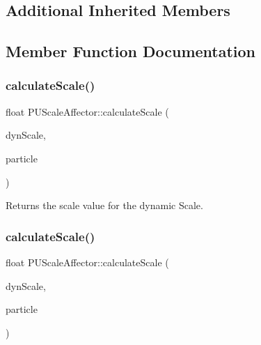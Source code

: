 \subsection*{Additional Inherited Members}


\subsection{Member Function Documentation}
\mbox{\label{classPUScaleAffector_a4a99c8bf0597163dbc7f25f8cdf69699}} 
\subsubsection{\texorpdfstring{calculate\+Scale()}{calculateScale()}\hspace{0.1cm}{\footnotesize\ttfamily [1/2]}}
{\footnotesize\ttfamily float P\+U\+Scale\+Affector\+::calculate\+Scale (\begin{DoxyParamCaption}\item[{\hyperlink{classPUDynamicAttribute}{P\+U\+Dynamic\+Attribute} $\ast$}]{dyn\+Scale,  }\item[{\hyperlink{structPUParticle3D}{P\+U\+Particle3D} $\ast$}]{particle }\end{DoxyParamCaption})\hspace{0.3cm}{\ttfamily [protected]}}

Returns the scale value for the dynamic Scale. \mbox{\label{classPUScaleAffector_a4a99c8bf0597163dbc7f25f8cdf69699}} 
\subsubsection{\texorpdfstring{calculate\+Scale()}{calculateScale()}\hspace{0.1cm}{\footnotesize\ttfamily [2/2]}}
{\footnotesize\ttfamily float P\+U\+Scale\+Affector\+::calculate\+Scale (\begin{DoxyParamCaption}\item[{\hyperlink{classPUDynamicAttribute}{P\+U\+Dynamic\+Attribute} $\ast$}]{dyn\+Scale,  }\item[{\hyperlink{structPUParticle3D}{P\+U\+Particle3D} $\ast$}]{particle }\end{DoxyParamCaption})\hspace{0.3cm}{\ttfamily [protected]}}


